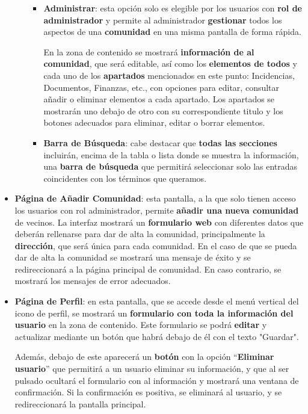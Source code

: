 \begin{appendices}
\begin{itemize}
\begin{itemize}
\begin{itemize}
			\item \textbf{Administrar}: esta opción solo es elegible por los usuarios con \textbf{rol de administrador} y permite al administrador \textbf{gestionar} todos los aspectos de una \textbf{comunidad} en una misma pantalla de forma rápida.
			
			En la zona de contenido se mostrará \textbf{información de al comunidad}, que será editable, así como los \textbf{elementos de todos} y cada uno de los \textbf{apartados} mencionados en este punto: Incidencias, Documentos, Finanzas, etc., con opciones para editar, consultar añadir o eliminar elementos a cada apartado. Los apartados se mostrarán uno debajo de otro con su correspondiente titulo y los botones adecuados para eliminar, editar o borrar elementos.
						
			\item \textbf{Barra de Búsqueda}: cabe destacar que \textbf{todas las secciones} incluirán, encima de la tabla o lista donde se muestra la información, una \textbf{barra de búsqueda} que permitirá seleccionar solo las entradas coincidentes con los términos que queramos.
		\end{itemize}
	\end{itemize}
		
	
	\item \textbf{Página de Añadir Comunidad}: esta pantalla, a la que solo tienen acceso los usuarios con rol administrador, permite \textbf{añadir una nueva comunidad} de vecinos. La interfaz mostrará un \textbf{formulario web} con diferentes datos que deberán rellenarse para dar de alta la comunidad, principalmente la \textbf{dirección}, que será única para cada comunidad. En el caso de que se pueda dar de alta la comunidad se mostrará una mensaje de éxito y se redireccionará a la página principal de comunidad. En caso contrario, se mostrará los mensajes de error adecuados.
	
	\item \textbf{Página de Perfil}: en esta pantalla, que se accede desde el menú vertical del icono de perfil, se mostrará un \textbf{formulario con toda la información del usuario} en la zona de contenido. Este formulario se podrá \textbf{editar} y actualizar mediante un botón que habrá debajo de él con el texto "Guardar". 
	
	Además, debajo de este aparecerá un \textbf{botón} con la opción ``\textbf{Eliminar usuario}'' que permitirá a un usuario eliminar su información, y que al ser pulsado ocultará el formulario con al información y mostrará una ventana de confirmación. Si la confirmación es positiva, se eliminará al usuario, y se redireccionará la pantalla principal.
\end{itemize}



\end{appendices}
